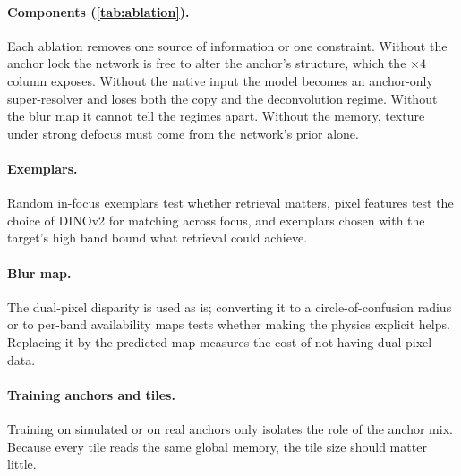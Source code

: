 \paragraph{Components (\cref{tab:ablation}).} Each ablation removes one source of information or one
constraint. Without the anchor lock the network is free to alter the anchor's structure, which the
$\times4$ column exposes. Without the native input the model becomes an anchor-only super-resolver and
loses both the copy and the deconvolution regime. Without the blur map it cannot tell the regimes apart.
Without the memory, texture under strong defocus must come from the network's prior alone.

\paragraph{Exemplars.} Random in-focus exemplars test whether retrieval matters, pixel features test
the choice of DINOv2 for matching across focus, and exemplars chosen with the target's high band bound
what retrieval could achieve. 

\paragraph{Blur map.} The dual-pixel disparity is used as is; converting it to a circle-of-confusion
radius or to per-band availability maps tests whether making the physics explicit helps. Replacing it
by the predicted map measures the cost of not having dual-pixel data. 

\paragraph{Training anchors and tiles.} Training on simulated or on real anchors only isolates the role
of the anchor mix. Because every tile reads the same global memory, the tile size should matter
little. 

